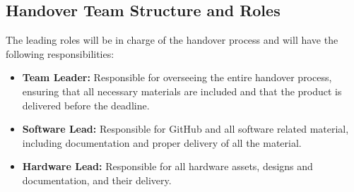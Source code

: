 

\subsection{Handover Team Structure and Roles}
\label{subsection:handover_team_structure_and_roles}

The leading roles will be in charge of the handover process and will have the following responsibilities:
\begin{itemize}
    \item \textbf{Team Leader:} Responsible for overseeing the entire handover process, ensuring that all necessary materials are included and that the product is delivered before the deadline.
    \item \textbf{Software Lead:} Responsible for GitHub and all software related material, including documentation and proper delivery of all the material. 
    \item \textbf{Hardware Lead:} Responsible  for all hardware assets, designs and documentation, and their delivery.
\end{itemize}


\begin{comment}
Our handover team includes the following roles:

\begin{itemize}
\item \textbf{Handover Team Leader:} Coordinates the handover process, ensuring that all project deliverables and documentation are transferred wholly and accurately.
\item \textbf{Handover Specialist:} Conducts presentations (if required), answers queries about the project, and ensures that the project owner is comfortable with understanding the project's results and operation.
\end{itemize}
\end{comment}


